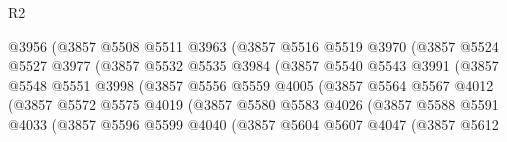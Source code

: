 \begin{lexlean}{R2}
\begin{coremodule}
                            @3956
                            (@3857
                              @5508
                              @5511
                              @3963
                              (@3857
                                @5516
                                @5519
                                @3970
                                (@3857
                                  @5524
                                  @5527
                                  @3977
                                  (@3857
                                    @5532
                                    @5535
                                    @3984
                                    (@3857
                                      @5540
                                      @5543
                                      @3991
                                      (@3857
                                        @5548
                                        @5551
                                        @3998
                                        (@3857
                                          @5556
                                          @5559
                                          @4005
                                          (@3857
                                            @5564
                                            @5567
                                            @4012
                                            (@3857
                                              @5572
                                              @5575
                                              @4019
                                              (@3857
                                                @5580
                                                @5583
                                                @4026
                                                (@3857
                                                  @5588
                                                  @5591
                                                  @4033
                                                  (@3857
                                                    @5596
                                                    @5599
                                                    @4040
                                                    (@3857
                                                      @5604
                                                      @5607
                                                      @4047
                                                      (@3857
                                                        @5612

\end{coremodule}
\end{lexlean}
